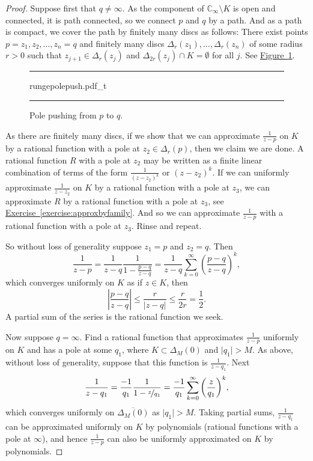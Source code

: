 \documentclass[12pt,openany]{book}
\newcommand{\sabs}[1]{\lvert {#1} \rvert}
\newcommand{\abs}[1]{\left\lvert {#1} \right\rvert}
\newcommand{\C}{{\mathbb{C}}}
\theoremstyle{plain}
\theoremstyle{remark}
\theoremstyle{definition}
\newenvironment{myfig}{%
\begin{figure}[h!t]
\noindent\rule{\textwidth}{0.5pt}\vspace{12pt}\par\centering}%
{\par\noindent\rule{\textwidth}{0.5pt}
\end{figure}}
\theoremstyle{exercise}
\theoremstyle{example}
\newcommand{\figureref}[1]{\hyperref[#1]{Figure~\ref*{#1}}}
\newcommand{\exerciseref}[1]{\hyperref[#1]{Exercise~\ref*{#1}}}
\begin{document}
\begin{proof}
Suppose first that $q \not= \infty$.
As the component of $\C_\infty \setminus K$ is open and connected, it is
path connected,
so we connect $p$ and $q$ by a path.
And as a path is compact,
we cover the path by finitely many discs as follows: 
There exist points $p=z_1,z_2,\ldots,z_n=q$ and
finitely many discs $\Delta_{r}(z_1),\ldots,\Delta_{r}(z_n)$
of some radius $r > 0$
such that $z_{j+1} \in \Delta_{r}(z_j)$
and $\Delta_{2r}(z_j) \cap K = \emptyset$ for all $j$.
See \figureref{fig:rungepolepush}.

\begin{myfig}
{rungepolepush.pdf_t}
\caption{Pole pushing from $p$ to $q$.\label{fig:rungepolepush}}
\end{myfig}

As there are finitely many discs, if we show that we can approximate
$\frac{1}{z-p}$ on $K$ by a rational function with a pole at $z_2 \in
\Delta_r(p)$, then we claim we are done.  A rational function $R$ with a pole
at $z_2$ may be written as
a finite linear combination of terms of the form $\frac{1}{{(z-z_2)}^k}$
or $(z-z_2)^k$.  If we can uniformly approximate $\frac{1}{z-z_2}$ on $K$ by a rational
function with a pole at $z_3$, we can approximate $R$ by a rational function
with a pole at $z_3$, see \exerciseref{exercise:approxbyfamily}.
And so we can approximate $\frac{1}{z-p}$ with a rational function with a pole at $z_3$.
Rinse and repeat.

So without loss of generality suppose $z_1=p$ and $z_2=q$.
Then
\begin{equation*}
\frac{1}{z-p}
=
\frac{1}{z-q}
\frac{1}{1-\frac{p-q}{z-q}}
=
\frac{1}{z-q}
\sum_{k=0}^\infty
{\left(\frac{p-q}{z-q}\right)}^k ,
\end{equation*}
which converges uniformly on $K$ as if $z \in K$, then
\begin{equation*}
\abs{\frac{p-q}{z-q}}
\leq 
\frac{r}{\sabs{z-q}}
\leq
\frac{r}{2r} = \frac{1}{2} .
\end{equation*}
A partial sum of the series is the rational function we seek.

Now suppose $q =\infty$. Find a rational function
that approximates $\frac{1}{z-p}$ uniformly on $K$ and has a pole
at some $q_1$, where
$K \subset \Delta_M(0)$ and $\sabs{q_1} > M$.
As above, without loss of generality, suppose that this function
is $\frac{1}{z-q_1}$.
Next
\begin{equation*}
\frac{1}{z-q_1}
=
\frac{-1}{q_1}
\frac{1}{1-\nicefrac{z}{q_1}}
=
\frac{-1}{q_1}
\sum_{k=0}^\infty
{\left(\frac{z}{q_1}\right)}^k ,
\end{equation*}
which converges uniformly on $\overline{\Delta_M(0)}$ as  $\sabs{q_1} > M$.
Taking partial sums, $\frac{1}{z-q_1}$ can be approximated
uniformly on $K$ by polynomials (rational functions with a pole at
$\infty$),
and hence $\frac{1}{z-p}$ can also be uniformly approximated on $K$ by polynomials.
\end{proof}
\end{document}
